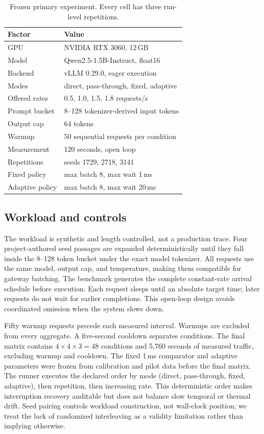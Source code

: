 \begin{table}[t]
  \centering
  \small
  \caption{Frozen primary experiment. Every cell has three run-level
  repetitions.}
  \label{tab:experiment}
  \begin{tabular}{ll}
    \toprule
    Factor & Value \\
    \midrule
    GPU & NVIDIA RTX 3060, 12\,GB \\
    Model & Qwen2.5-1.5B-Instruct, float16 \\
    Backend & vLLM 0.29.0, eager execution \\
    Modes & direct, pass-through, fixed, adaptive \\
    Offered rates & 0.5, 1.0, 1.5, 1.8 requests/s \\
    Prompt bucket & 8--128 tokenizer-derived input tokens \\
    Output cap & 64 tokens \\
    Warmup & 50 sequential requests per condition \\
    Measurement & 120 seconds, open loop \\
    Repetitions & seeds 1729, 2718, 3141 \\
    Fixed policy & max batch 8, max wait 1\,ms \\
    Adaptive policy & max batch 8, max wait 20\,ms \\
    \bottomrule
  \end{tabular}
\end{table}

\subsection{Workload and controls}

The workload is synthetic and length controlled, not a production trace. Four
project-authored seed passages are expanded deterministically until they fall
inside the 8--128 token bucket under the exact model tokenizer. All requests
use the same model, output cap, and temperature, making them compatible for
gateway batching. The benchmark generates the complete constant-rate arrival
schedule before execution. Each request sleeps until an absolute target time;
later requests do not wait for earlier completions. This open-loop design
avoids coordinated omission when the system slows down.

Fifty warmup requests precede each measured interval. Warmups are excluded
from every aggregate. A five-second cooldown separates conditions. The final
matrix contains $4\times4\times3=48$ conditions and 5,760 seconds of measured
traffic, excluding warmup and cooldown. The fixed 1\,ms comparator and adaptive
parameters were frozen from calibration and pilot data before the final matrix.
The runner executes the declared order by mode (direct, pass-through, fixed,
adaptive), then repetition, then increasing rate. This deterministic order
makes interruption recovery auditable but does not balance slow temporal or
thermal drift. Seed pairing controls workload construction, not wall-clock
position; we treat the lack of randomized interleaving as a validity
limitation rather than implying otherwise.

